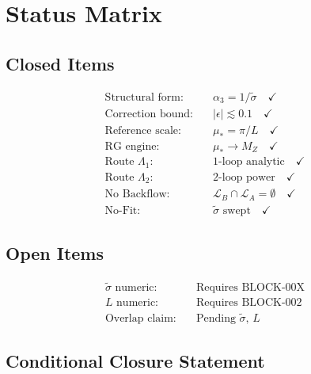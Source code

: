 \documentclass[11pt,a4paper]{article}
\theoremstyle{definition}
\begin{document}
\section{Status Matrix}
\label{app:status-matrix}

\subsection{Closed Items}
\label{subsec:status-closed}

\begin{align}
\label{eq:status-1}
\text{Structural form:} &\quad \alpha_3 = 1/\tilde{\sigma} \quad \checkmark \\
\label{eq:status-2}
\text{Correction bound:} &\quad |\epsilon| \lesssim 0.1 \quad \checkmark \\
\label{eq:status-3}
\text{Reference scale:} &\quad \mu_* = \pi/L \quad \checkmark \\
\label{eq:status-4}
\text{RG engine:} &\quad \mu_* \to M_Z \quad \checkmark \\
\label{eq:status-5}
\text{Route $\Lambda_1$:} &\quad \text{1-loop analytic} \quad \checkmark \\
\label{eq:status-6}
\text{Route $\Lambda_2$:} &\quad \text{2-loop power} \quad \checkmark \\
\label{eq:status-7}
\text{No Backflow:} &\quad \mathcal{L}_B \cap \mathcal{L}_A = \emptyset \quad \checkmark \\
\label{eq:status-8}
\text{No-Fit:} &\quad \tilde{\sigma} \text{ swept} \quad \checkmark
\end{align}

\subsection{Open Items}
\label{subsec:status-open}

\begin{align}
\label{eq:status-9}
\text{$\tilde{\sigma}$ numeric:} &\quad \text{Requires BLOCK-00X} \\
\label{eq:status-10}
\text{$L$ numeric:} &\quad \text{Requires BLOCK-002} \\
\label{eq:status-11}
\text{Overlap claim:} &\quad \text{Pending $\tilde{\sigma}$, $L$}
\end{align}

\subsection{Conditional Closure Statement}
\label{subsec:status-conditional}
\end{document}
